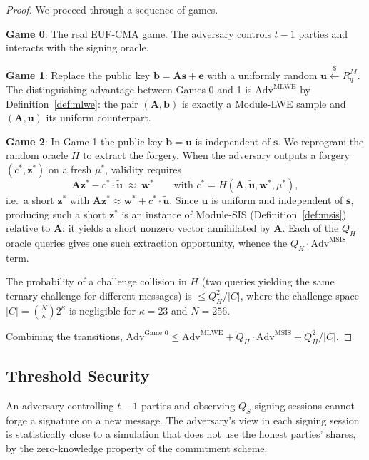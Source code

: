 \begin{proof}
We proceed through a sequence of games.

\textbf{Game 0}: The real EUF-CMA game. The adversary controls $t-1$ parties and
interacts with the signing oracle.

\textbf{Game 1}: Replace the public key $\mathbf{b} = \mathbf{A}\mathbf{s} + \mathbf{e}$
with a uniformly random $\mathbf{u} \stackrel{\$}{\leftarrow} R_q^{M}$. The distinguishing
advantage between Games 0 and 1 is $\text{Adv}^{\text{MLWE}}$ by
Definition~\ref{def:mlwe}: the pair $(\mathbf{A}, \mathbf{b})$ is exactly a Module-LWE
sample and $(\mathbf{A}, \mathbf{u})$ its uniform counterpart.

\textbf{Game 2}: In Game 1 the public key $\mathbf{b} = \mathbf{u}$ is independent of
$\mathbf{s}$. We reprogram the random oracle $H$ to extract the forgery. When the
adversary outputs a forgery $(c^*, \mathbf{z}^*)$ on a fresh $\mu^*$, validity requires
\[
\mathbf{A}\mathbf{z}^* - c^* \cdot \tilde{\mathbf{u}} \;\approx\; \mathbf{w}^*
\qquad\text{with } c^* = H(\mathbf{A}, \tilde{\mathbf{u}}, \mathbf{w}^*, \mu^*),
\]
i.e.\ a short $\mathbf{z}^*$ with $\mathbf{A}\mathbf{z}^* \approx \mathbf{w}^* + c^* \cdot \tilde{\mathbf{u}}$.
Since $\mathbf{u}$ is uniform and independent of $\mathbf{s}$, producing such a short
$\mathbf{z}^*$ is an instance of Module-SIS (Definition~\ref{def:msis}) relative to
$\mathbf{A}$: it yields a short nonzero vector annihilated by $\mathbf{A}$. Each of the
$Q_H$ oracle queries gives one such extraction opportunity, whence the
$Q_H \cdot \text{Adv}^{\text{MSIS}}$ term.

The probability of a challenge collision in $H$ (two queries yielding the same ternary
challenge for different messages) is $\leq Q_H^2 / |C|$, where the challenge space
$|C| = \binom{N}{\kappa} 2^\kappa$ is negligible for $\kappa = 23$ and $N = 256$.

Combining the transitions,
$\text{Adv}^{\text{Game 0}} \leq \text{Adv}^{\text{MLWE}} + Q_H \cdot \text{Adv}^{\text{MSIS}} + Q_H^2 / |C|$.
\end{proof}

\subsection{Threshold Security}

\begin{lemma}
\label{lem:threshold}
An adversary controlling $t-1$ parties and observing $Q_S$ signing sessions cannot
forge a signature on a new message. The adversary's view in each signing session
is statistically close to a simulation that does not use the honest parties' shares,
by the zero-knowledge property of the commitment scheme.
\end{lemma}


